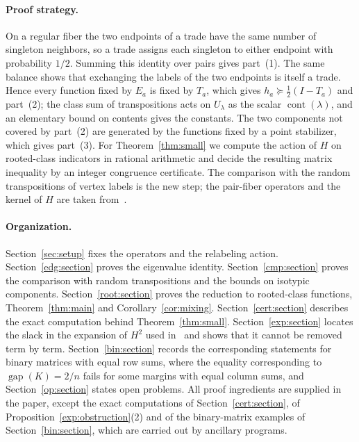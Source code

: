 \paragraph{Proof strategy.}
On a regular fiber the two endpoints of a trade have the same number of
singleton neighbors, so a trade assigns each singleton to either endpoint with
probability $1/2$. Summing this identity over pairs gives part~(1). The same
balance shows that exchanging the labels of the two endpoints is itself a
trade. Hence every function fixed by $E_a$ is fixed by $T_a$, which gives
$h_a\succeq\tfrac12(I-T_a)$ and part~(2); the class sum of transpositions acts
on $U_\lambda$ as the scalar $\operatorname{cont}(\lambda)$, and an elementary
bound on contents gives the constants. The two components not covered by
part~(2) are generated by the functions fixed by a point stabilizer, which
gives part~(3). For Theorem~\ref{thm:small} we compute the action of $H$ on
rooted-class indicators in rational arithmetic and decide the resulting matrix
inequality by an integer congruence certificate. The comparison with the random transpositions of
vertex labels is the new step; the pair-fiber operators and the kernel of $H$
are taken from~\cite{OAI26,S26}.

\paragraph{Organization.}
Section~\ref{sec:setup} fixes the operators and the relabeling action.
Section~\ref{edg:section} proves the eigenvalue identity.
Section~\ref{cmp:section} proves the comparison with random transpositions and
the bounds on isotypic components. Section~\ref{root:section} proves the
reduction to rooted-class functions, Theorem~\ref{thm:main} and
Corollary~\ref{cor:mixing}. Section~\ref{cert:section} describes the exact
computation behind Theorem~\ref{thm:small}. Section~\ref{exp:section} locates
the slack in the expansion of $H^2$ used in~\cite{S26} and shows that it cannot
be removed term by term. Section~\ref{bin:section} records the corresponding
statements for binary matrices with equal row sums, where the equality
corresponding to $\operatorname{gap}(K)=2/n$ fails for some margins with
equal column sums, and
Section~\ref{op:section} states open problems. All proof ingredients are
supplied in the paper, except the exact computations of
Section~\ref{cert:section}, of Proposition~\ref{exp:obstruction}(2) and of
the binary-matrix examples of Section~\ref{bin:section}, which are carried
out by ancillary programs.
